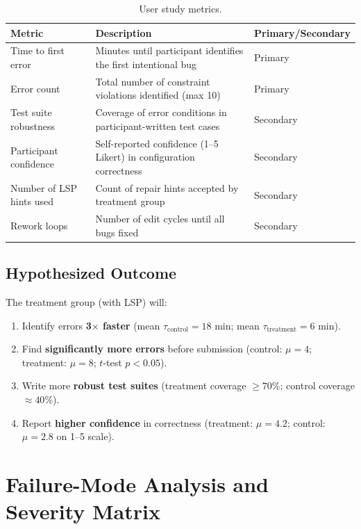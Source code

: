 \begin{table}[h]
\centering
\renewcommand{\arraystretch}{1.35}
\begin{tabular}{@{}lp{5.5cm}l@{}}
\toprule
\textbf{Metric} & \textbf{Description} & \textbf{Primary/Secondary} \\
\midrule
Time to first error & Minutes until participant identifies the first intentional bug & Primary \\
Error count & Total number of constraint violations identified (max 10) & Primary \\
Test suite robustness & Coverage of error conditions in participant-written test cases & Secondary \\
Participant confidence & Self-reported confidence (1--5 Likert) in configuration correctness & Secondary \\
Number of LSP hints used & Count of repair hints accepted by treatment group & Secondary \\
Rework loops & Number of edit cycles until all bugs fixed & Secondary \\
\bottomrule
\end{tabular}
\caption{User study metrics.}
\label{tab:userstudy}
\end{table}

\subsection{Hypothesized Outcome}

\begin{hypothesis}
The treatment group (with LSP) will:
\begin{enumerate}
  \item Identify errors \textbf{3$\times$ faster} (mean $\tau_{\mathrm{control}} = 18$ min;
        mean $\tau_{\mathrm{treatment}} = 6$ min).
  \item Find \textbf{significantly more errors} before submission
        (control: $\mu = 4$; treatment: $\mu = 8$; $t$-test $p < 0.05$).
  \item Write more \textbf{robust test suites} (treatment coverage $\geq 70\%$;
        control coverage $\approx 40\%$).
  \item Report \textbf{higher confidence} in correctness
        (treatment: $\mu = 4.2$; control: $\mu = 2.8$ on 1--5 scale).
\end{enumerate}
\end{hypothesis}

\section{Failure-Mode Analysis and Severity Matrix}

